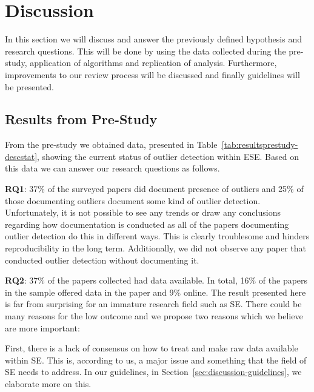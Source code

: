 ﻿\section{Discussion}
\label{sec:discussion}
In this section we will discuss and answer the previously defined hypothesis and research questions. This will be done by using the data collected during the pre-study, application of algorithms and replication of analysis. Furthermore, improvements to our review process will be discussed and finally guidelines will be presented.


\subsection{Results from Pre-Study}
\label{sec:discussion-resultsprestudy}
From the pre-study we obtained data, presented in Table~\ref{tab:resultsprestudy-descstat}, showing the current status of outlier detection within ESE. Based on this data we can answer our research questions as follows.


\textbf{RQ1}: 37\% of the surveyed papers did document presence of outliers and 25\% of those documenting outliers document some kind of outlier detection. Unfortunately, it is not possible to see any trends or draw any conclusions regarding how documentation is conducted as all of the papers documenting outlier detection do this in different ways. This is clearly troublesome and hinders reproducibility in the long term. Additionally, we did not observe any paper that conducted outlier detection without documenting it.


\textbf{RQ2}: 37\% of the papers collected had data available. In total, 16\% of the papers in the sample offered data in the paper and 9\% online. The result presented here is far from surprising for an immature research field such as SE\@. There could be many reasons for the low outcome and we propose two reasons which we believe are more important: 


First, there is a lack of consensus on how to treat and make raw data available within SE\@. This is, according to us, a major issue and something that the field of SE needs to address. In our guidelines, in Section~\ref{sec:discussion-guidelines}, we elaborate more on this.


